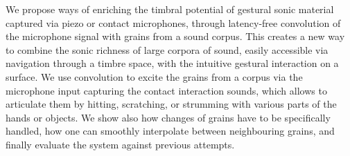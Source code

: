 We propose ways of enriching the timbral potential of gestural sonic material captured via piezo or contact microphones, through latency-free convolution of the microphone signal with grains from a sound corpus.
%
This creates a new way to combine the sonic richness of large corpora of sound, easily accessible via navigation through a timbre space, with the intuitive gestural interaction on a surface.
%
We use convolution to excite the grains from a corpus via the microphone input capturing the contact interaction sounds, which allows to articulate them by hitting, scratching, or strumming with various parts of the hands or objects.
%
We show also how changes of grains have to be specifically handled, how one can smoothly interpolate between neighbouring grains, and finally evaluate the system against previous attempts.
